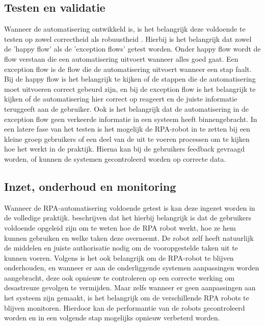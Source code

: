 \subsection{Testen en validatie}
\label{subsec:testen-en-validatie}

Wanneer de automatisering ontwikkeld is, is het belangrijk deze voldoende te testen op zowel correctheid als robuustheid \autocite{Liu2023}. Hierbij is het belangrijk dat zowel de 'happy flow' als de 'exception flows' getest worden. Onder happy flow wordt de flow verstaan die een automatisering uitvoert wanneer alles goed gaat. Een exception flow is de flow die de automatisering uitvoert wanneer een stap faalt. Bij de happy flow is het belangrijk te kijken of de stappen die de automatisering moet uitvoeren correct gebeurd zijn, en bij de exception flow is het belangrijk te kijken of de automatisering hier correct op reageert en de juiste informatie teruggeeft aan de gebruiker. Ook is het belangrijk dat de automatisering in de exception flow geen verkeerde informatie in een systeem heeft binnengebracht.
In een latere fase van het testen is het mogelijk de RPA-robot in te zetten bij een kleine groep gebruikers of een deel van de uit te voeren processen om te kijken hoe het werkt in de praktijk. Hierna kan bij de gebruikers feedback gevraagd worden, of kunnen de systemen gecontroleerd worden op correcte data.

\subsection{Inzet, onderhoud en monitoring}
\label{subsec:inzet-onderhoud-en-monitoring}

Wanneer de RPA-automatisering voldoende getest is kan deze ingezet worden in de volledige praktijk. \textcite{Lievanomartinez2022} beschrijven dat het hierbij belangrijk is dat de gebruikers voldoende opgeleid zijn om te weten hoe de RPA robot werkt, hoe ze hem kunnen gebruiken en welke taken deze overneemt. De robot zelf heeft natuurlijk de middelen en juiste authorisatie nodig om de vooropgestelde taken uit te kunnen voeren. Volgens \textcite{vanDerAalst2018} is het ook belangrijk om de RPA-robot te blijven onderhouden, en wanneer er aan de onderliggende systemen aanpassingen worden aangebracht, deze ook opnieuw te controleren op een correcte werking om desastreuze gevolgen te vermijden.
Maar zelfs wanneer er geen aanpassingen aan het systeem zijn gemaakt, is het belangrijk om de verschillende RPA robots te blijven monitoren. Hierdoor kan de performantie van de robots gecontroleerd worden en in een volgende stap mogelijks opnieuw verbeterd worden.

